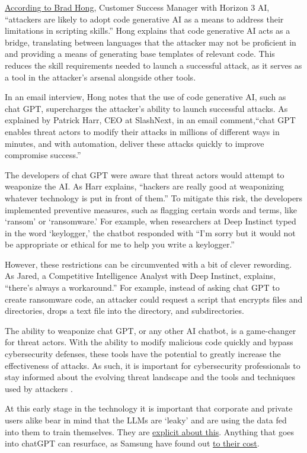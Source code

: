 \href{https://securityintelligence.com/news/are-threat-actors-using-chatgpt-to-hack-your-network/}{According to Brad Hong}, Customer Success Manager with Horizon 3 AI, ``attackers are likely to adopt code generative AI as a means to address their limitations in scripting skills.'' Hong explains that code generative AI acts as a bridge, translating between languages that the attacker may not be proficient in and providing a means of generating base templates of relevant code. This reduces the skill requirements needed to launch a successful attack, as it serves as a tool in the attacker's arsenal alongside other tools.\par
In an email interview, Hong notes that the use of code generative AI, such as chat GPT, supercharges the attacker's ability to launch successful attacks. As explained by Patrick Harr, CEO at SlashNext, in an email comment,``chat GPT enables threat actors to modify their attacks in millions of different ways in minutes, and with automation, deliver these attacks quickly to improve compromise success.''\par
The developers of chat GPT were aware that threat actors would attempt to weaponize the AI. As Harr explains, ``hackers are really good at weaponizing whatever technology is put in front of them.'' To mitigate this risk, the developers implemented preventive measures, such as flagging certain words and terms, like `ransom' or `ransomware.' For example, when researchers at Deep Instinct typed in the word `keylogger,' the chatbot responded with ``I'm sorry but it would not be appropriate or ethical for me to help you write a keylogger.''\par
However, these restrictions can be circumvented with a bit of clever rewording. As Jared, a Competitive Intelligence Analyst with Deep Instinct, explains, ``there's always a workaround.'' For example, instead of asking chat GPT to create ransomware code, an attacker could request a script that encrypts files and directories, drops a text file into the directory, and subdirectories.\par
The ability to weaponize chat GPT, or any other AI chatbot, is a game-changer for threat actors. With the ability to modify malicious code quickly and bypass cybersecurity defenses, these tools have the potential to greatly increase the effectiveness of attacks. As such, it is important for cybersecurity professionals to stay informed about the evolving threat landscape and the tools and techniques used by attackers \cite{brundage2018malicious}.\par 
At this early stage in the technology it is important that corporate and private users alike bear in mind that the LLMs are `leaky' and are using the data fed into them to train themselves. They are \href{https://help.openai.com/en/articles/6783457-chatgpt-general-faq}{explicit about this}. Anything that goes into chatGPT can resurface, as Samsung have found out \href{https://cybernews.com/news/chatgpt-samsung-data-leak/}{to their cost}.
